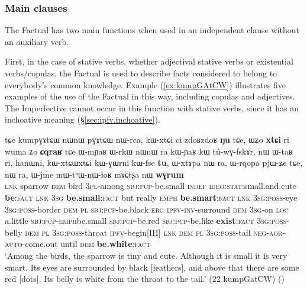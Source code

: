 \subsubsection{Main clauses} \label{sec:fact.main.clauses}
The Factual has two main functions when used in an independent clause without an auxiliary verb. 

First,  in the case of stative verbs, whether adjectival stative verbs or existential verbs/copulas, the Factual is used to describe facts considered to belong to everybody's common knowledge. Example (\ref{ex:kumpGAtCW}) illustrates five examples of the use of the Factual in this way, including copulas and adjectives. The Imperfective cannot occur in this function with stative verbs, since it has an inchoative meaning (§\ref{sec:ipfv.inchoative}).


\begin{exe}
\ex \label{ex:kumpGAtCW}
\gll tɕe kumpɣɤtɕɯ nɯnɯ pɣɤtɕɯ nɯ-rca, kɯ-xtɕi ci zdoʁzdoʁ \textbf{ŋu} tɕe, ɯʑo \textbf{xtɕi} ri wuma ʑo \textbf{ɕqraʁ} tɕe ɯ-mɲaʁ ɯ-rkɯ nɯnɯ ra kɯ-ɲaʁ kɯ tú-wɣ-fskɤr, nɯ ɯ-taʁ ri, hanɯni, kɯ-xtɕɯ\redp{}xtɕi kɯ-ɣɯrni kɯ-fse \textbf{tu}, ɯ-xtɤpa nɯ ra, ɯ-rqopa pjɯ-ʑe tɕe, nɯ ra, ɯ-jme mɯ-tʰɯ-nɯ-ɬoʁ mɤɕtʂa nɯ \textbf{wɣrum}  \\
\textsc{lnk} sparrow \textsc{dem} bird \textsc{3pl}-among \textsc{sbj}:\textsc{pcp}-be.small \textsc{indef} \textsc{ideo}:\textsc{stat}:small.and.cute \textbf{be}:\textsc{fact} \textsc{lnk}  \textsc{3sg} \textbf{be.small}:\textsc{fact} but really \textsc{emph} \textbf{be.smart}:\textsc{fact}  \textsc{lnk}  \textsc{3sg}:\textsc{poss}-eye \textsc{3sg}:\textsc{poss}-border \textsc{dem}  \textsc{pl}  \textsc{sbj}:\textsc{pcp}-be.black \textsc{erg} \textsc{ipfv}-\textsc{inv}-surround \textsc{dem} \textsc{3sg}-on \textsc{loc} a.little \textsc{sbj}:\textsc{pcp}-\textsc{emph}\redp{}be.small \textsc{sbj}:\textsc{pcp}-be.red \textsc{sbj}:\textsc{pcp}-be.like \textbf{exist}:\textsc{fact} \textsc{3sg}:\textsc{poss}-belly \textsc{dem}  \textsc{pl}  \textsc{3sg}:\textsc{poss}-throat \textsc{ipfv}-begin[III] \textsc{lnk}   \textsc{dem}  \textsc{pl}  \textsc{3sg}:\textsc{poss}-tail \textsc{neg}-\textsc{aor}-\textsc{auto}-come.out until \textsc{dem} \textbf{be.white}:\textsc{fact} \\
\glt `Among the birds, the sparrow is tiny and cute. Although it is small it is very smart. Its eyes are surrounded by black [feathers], and above that there are some red [dots]. Its belly is white from the throat to the tail.' (22 kumpGatCW)
()
\end{exe}

